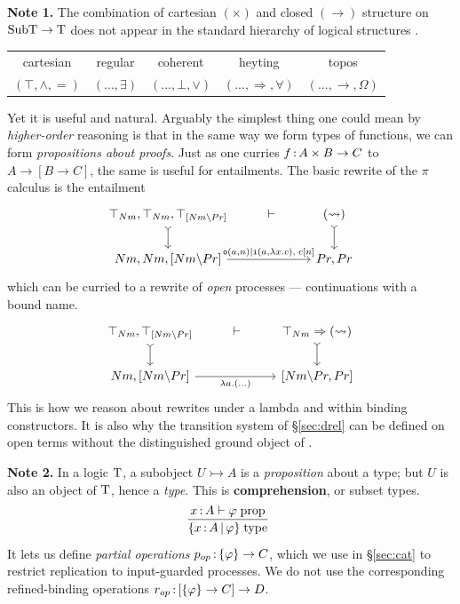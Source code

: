 \documentclass{article}
\begin{document}
\vspace{1em}

\textbf{Note 1.} The combination of cartesian $(\times)$ and closed $(\to)$ structure on $\mathrm{SubT\to T}$ does not appear in the standard hierarchy of logical structures \citep{elephant}.

\begin{center}
    \begin{tabular}{c@{\qquad}c@{\qquad}c@{\qquad}c@{\qquad}c}
         cartesian & regular & coherent & heyting & topos\\
         $(\top,\land,=)$ & $(...,\exists)$ & $(...,\bot,\lor)$ & $(...,\Rightarrow,\forall)$ & $(...,\to,\Omega)$
    \end{tabular}
\end{center}
Yet it is useful and natural. Arguably the simplest thing one could mean by \emph{higher-order} reasoning is that in the same way we form types of functions, we can form \emph{propositions about proofs}. Just as one curries $f\,{:}\, A\times B\to C$ to $A\to [B\to C]$, the same is useful for entailments. The basic rewrite of the $\pi$ calculus is the entailment
\[\begin{tikzcd}
	{\top_{Nm},\top_{Nm},\top_{[Nm\lam Pr]}} & \vdash & {(\rsq)} \\
	{Nm,Nm,[Nm{\setminus}Pr]} && {Pr,Pr}
	\arrow[tail, from=1-1, to=2-1]
	\arrow[tail, from=1-3, to=2-3]
	\arrow["{\mtt{o}(a,n)|\mtt{i}(a,\lambda x.c),\; c[n]}", from=2-1, to=2-3]
\end{tikzcd}\]
which can be curried to a rewrite of \emph{open} processes --- continuations with a bound name.
\[\begin{tikzcd}
	{\top_{Nm},\top_{[Nm\lam Pr]}} & \vdash & {\top_{Nm}\ra (\rsq)} \\
	{Nm,[Nm{\setminus}Pr]} && {[Nm\lam Pr,Pr]}
	\arrow[tail, from=1-1, to=2-1]
	\arrow[tail, from=1-3, to=2-3]
	\arrow["{\lambda a.(...)}"', from=2-1, to=2-3]
\end{tikzcd}\]
This is how we reason about rewrites under a lambda and within binding constructors. It is also why the transition system of \S\ref{sec:drel} can be defined on open terms without the distinguished ground object of \citet{lm}.

\vspace{1em}

\textbf{Note 2.} In a logic $\mathrm{T}$, a subobject $U\rightarrowtail A$ is a \emph{proposition} about a type; but $U$ is also an object of $\mathrm{T}$, hence a \emph{type}. This is \textbf{comprehension}, or subset types.
\[\infr{x\of A\vdash \varphi\;\mrm{prop}}{\{x\of A\ctx \varphi\}\;\mrm{type}}\]
It lets us define \emph{partial operations} $p_{op}\,{:}\, \{\varphi\}\to C$, which we use in \S\ref{sec:cat} to restrict replication to input-guarded processes. We do not use the corresponding refined-binding operations $r_{op}\,{:}\, [\{\varphi\}\to C]\to D$.
\end{document}
